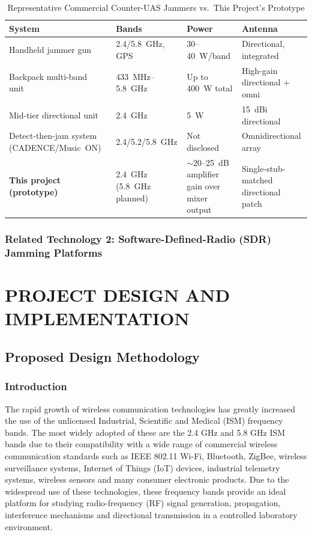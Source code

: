 \documentclass[12pt,a4paper]{report}
\begin{document}
	\begin{table}[h]
	\centering
	\caption{Representative Commercial Counter-UAS Jammers vs.\ This Project's Prototype}
	\label{tab:commercial-comp}
	\begin{tabular}{@{}p{3.4cm}p{2.6cm}p{2.6cm}p{2.6cm}@{}}
		\toprule
		\textbf{System} & \textbf{Bands} & \textbf{Power} & \textbf{Antenna} \\
		\midrule
		Handheld jammer gun~\cite{ref29} & 2.4/5.8~GHz, GPS & 30--40~W/band & Directional, integrated \\
		Backpack multi-band unit~\cite{ref31} & 433~MHz--5.8~GHz & Up to 400~W total & High-gain directional + omni \\
		Mid-tier directional unit~\cite{ref11} & 2.4~GHz & 5~W & 15~dBi directional \\
		Detect-then-jam system (CADENCE/Music~ON)~\cite{ref12} & 2.4/5.2/5.8~GHz & Not disclosed & Omnidirectional array \\
		\textbf{This project (prototype)} & 2.4~GHz (5.8~GHz planned) & $\sim$20--25~dB amplifier gain over mixer output & Single-stub-matched directional patch \\
		\bottomrule
	\end{tabular}
	\end{table}
	
	\subsection{Related Technology 2: Software-Defined-Radio (SDR) Jamming Platforms}
	
	
	\chapter{PROJECT DESIGN AND IMPLEMENTATION}
	
	\section{Proposed Design Methodology}
	
	\subsection{Introduction}
	The rapid growth of wireless communication technologies has greatly increased the use of the unlicensed Industrial, Scientific and Medical (ISM) frequency bands. The most widely adopted of these are the 2.4 GHz and 5.8 GHz ISM bands due to their compatibility with a wide range of commercial wireless communication standards such as IEEE 802.11 Wi-Fi, Bluetooth, ZigBee, wireless surveillance systems, Internet of Things (IoT) devices, industrial telemetry systems, wireless sensors and many consumer electronic products. Due to the widespread use of these technologies, these frequency bands provide an ideal platform for studying radio-frequency (RF) signal generation, propagation, interference mechanisms and directional transmission in a controlled laboratory environment.
	\vspace{0.5cm}
	
\end{document}
